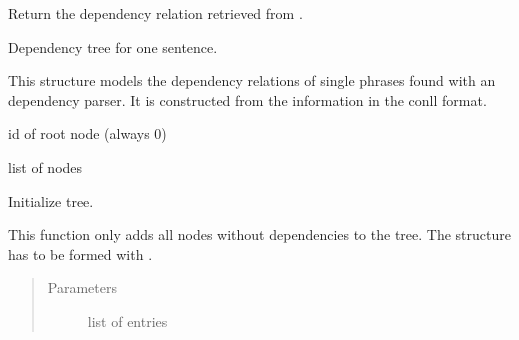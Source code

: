 \documentclass[letterpaper,10pt,english]{sphinxmanual}
\begin{document}
\begin{fulllineitems}
\begin{fulllineitems}
\end{fulllineitems}


\begin{fulllineitems}
\label{\detokenize{api:conll_parser.Node.get_dep}}
Return the dependency relation retrieved from .

\end{fulllineitems}


\end{fulllineitems}


\begin{fulllineitems}
\label{\detokenize{api:conll_parser.Tree}}
Dependency tree for one sentence.

This structure models the dependency relations of single phrases
found with an dependency parser. It is constructed from the
information in the conll format.

\begin{fulllineitems}
\label{\detokenize{api:conll_parser.Tree.root}}
id of root node (always 0)

\end{fulllineitems}


\begin{fulllineitems}
\label{\detokenize{api:conll_parser.Tree.nodes}}
list of nodes

\end{fulllineitems}


\begin{fulllineitems}
\label{\detokenize{api:conll_parser.Tree.__init__}}
Initialize tree.

This function only adds all nodes without dependencies to the
tree. The structure has to be formed with
{\hyperref[\detokenize{api:conll_parser.Tree.create_tree_structure}]{}}.
\begin{quote}\begin{description}
\item[{Parameters}] \leavevmode
{} \textendash{} list of entries


\end{description}
\end{quote}
\end{fulllineitems}
\end{fulllineitems}
\end{document}

